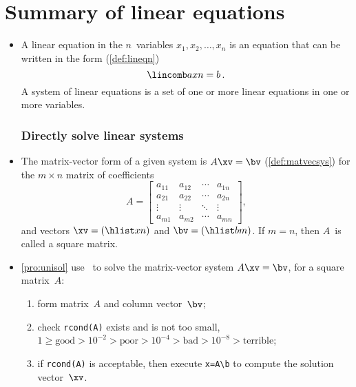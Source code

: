 
\section{Summary of linear equations}
\label{sec:sumle}

\begin{itemize}
\def\index#1{}%


\subsubsection{Introduction to systems of linear equations}


\item A {linear equation} in the \(n\)~variables \(x_1,x_2,\ldots,x_n\) is an equation that can be written in the form (\autoref{def:lineqn})
\begin{equation*}
\lincomb axn=b\,.
\end{equation*}
A {system} of linear equations is a set of one or more linear equations in one or more variables.




\subsubsection{Directly solve linear systems}

\item The {matrix-vector form} of a given system is \(A\xv=\bv\) (\autoref{def:matvecsys}) for the \(m\times n\) {matrix} of coefficients
\begin{equation*}
A=\begin{bmatrix} a_{11}&a_{12}&\cdots&a_{1n}
\\a_{21}&a_{22}&\cdots&a_{2n}
\\\vdots&\vdots&\ddots&\vdots
\\a_{m1}&a_{m2}&\cdots&a_{mn} \end{bmatrix},
\end{equation*}
and vectors \(\xv=(\hlist xn)\) and \(\bv=(\hlist bm)\).
If \(m=n\), then \(A\)~is called a {square matrix}.

\item \autoref{pro:unisol} use \script\ to solve the matrix-vector system \(A\xv=\bv\), for a {square matrix}~\(A\): 
\begin{enumerate}
\item form matrix~\(A\) and {column vector}~\(\bv\);
\item check \verb|rcond(A)| exists and is not too small, \(1\geq\text{good} >10^{-2} >\text{poor} >10^{-4} >\text{bad} >10^{-8} >\text{terrible}\);
\item if \verb|rcond(A)| is acceptable, then execute \verb|x=A\b| to compute the solution vector~\(\xv\). 
\end{enumerate}



\end{itemize}
